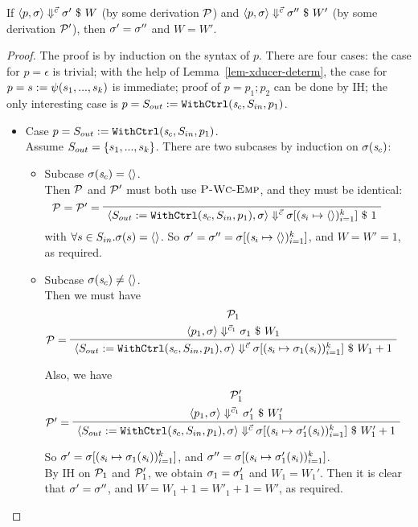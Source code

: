 \begin{thm} \label{thm-svcode-determ}
	If $\left\langle p,\sigma \right\rangle \Downarrow^{\vec c} \sigma' \ \$ \ W$ (by some derivation $\mathcal{P}$) and $\left\langle p,\sigma \right\rangle \Downarrow^{\vec c} \sigma'' \ \$ \ W'$ (by some derivation $\mathcal{P}'$), 
	then $\sigma' = \sigma''$ and $W = W'$.
\end{thm}

\begin{proof}
	The proof is by induction on the syntax of $p$. There are four cases: the case for $p = \epsilon$ is trivial; with the help of Lemma~\ref{lem-xducer-determ}, the case for $p = s := \psi(s_1,...,s_k)$ is immediate; proof of $p = p_1; p_2$ can be done by IH; the only interesting case is $p = S_{out} := \mathtt{WithCtrl}(\mathit{s}_c,S_{in},p_1)$.
	\begin{itemize}
		\item Case $p = S_{out} := \mathtt{WithCtrl}(\mathit{s}_c,S_{in},p_1)$. \\
		Assume $S_{out} = \{s_1,...,s_k\}$. There are two subcases by induction on $\sigma(\mathit{s}_c)$: 
		\begin{itemize}
			\item Subcase $\sigma(\mathit{s}_c) = \langle \rangle$. \\
			Then $\mathcal{P}$ and $\mathcal{P}'$ must both use $\textsc{P-Wc-Emp}$, and they must be identical:		
			$$\PT{ 
				\LeLa{\MP= \MP' =}
				\Axiom{\seval{\withctrl{\s_c}{p_1}{\Sin}{\Sout}}{\sgm}{\c}{\sgm[\k{\s_i \|-> \emptyv}]}1}
			}$$
			with $ \forall s \in S_{in}. \sigma(s) = \langle \rangle$.
			So $\sgm' = \sgm'' = \sgm[\k{\s_i \|-> \emptyv}]$, and $W = W' = 1$, as required. 
			
			\item Subcase $\sigma(\mathit{s}_c) \neq \langle \rangle$. \\
			Then we must have
			$$\PT{
				\UCN{\MP_1}{\seval{p_1}{\sgm}{\c_1}{\sgm_1}{W_1}}
				\LeLa{\MP = }
				\UC{\seval{\withctrl{\s_c}{p_1}{\Sin}{\Sout}}{\sgm}{\c}{\sgm[\k{\s_i \|-> \sgm_1(\s_i)}]}{W_1+1}}
			}$$
			
			Also, we have
			$$\PT{
				\UCN{\MP'_1}{\seval{p_1}{\sgm}{\c_1}{\sgm'_1}{W'_1}}
				\LeLa{\MP' = }
				\UC{\seval{\withctrl{\s_c}{p_1}{\Sin}{\Sout}}{\sgm}{\c}{\sgm[\k{\s_i \|-> \sgm'_1(\s_i)}]}{W'_1+1}}
			}$$
			
			So $\sgm' = \sgm[\k{\s_i \|-> \sgm_1(\s_i)}]$, 
			and $\sgm'' = \sgm[\k{\s_i \|-> \sgm'_1(\s_i)}]$. \\
			By IH on $\mathcal{P}_1$ and $\mathcal{P}'_1$, we obtain
			$\sigma_1 = \sigma_1'$ and  $W_1 = W_1'$.
			Then it is clear that $\sigma' = \sigma''$, and $W = W_1+1 = W'_1+ 1 = W'$, as required.
			
		\end{itemize} 
		
	\end{itemize}
	
\end{proof}




